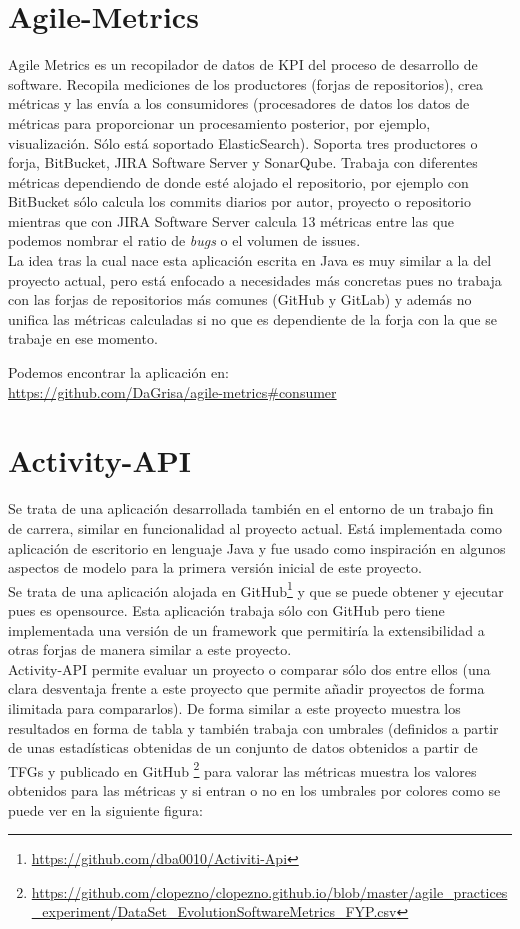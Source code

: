 \section{Agile-Metrics}
Agile Metrics es un recopilador de datos de KPI del proceso de desarrollo de software. Recopila mediciones de los productores (forjas de repositorios), crea métricas y las envía a los consumidores (procesadores de datos los datos de métricas para proporcionar un procesamiento posterior, por ejemplo, visualización. Sólo está soportado ElasticSearch). Soporta tres productores o forja, BitBucket, JIRA Software Server y SonarQube. Trabaja con diferentes métricas dependiendo de donde esté alojado el repositorio, por ejemplo con BitBucket sólo calcula los commits diarios por autor, proyecto o repositorio mientras que con JIRA Software Server calcula 13 métricas entre las que podemos nombrar el ratio de \textit{bugs} o el volumen de issues.\\

La idea tras la cual nace esta aplicación escrita en Java es muy similar a la del proyecto actual, pero está enfocado a necesidades más concretas pues no trabaja con las forjas de repositorios más comunes (GitHub y GitLab) y además no unifica las métricas calculadas si no que es dependiente de la forja con la que se trabaje en ese momento.

Podemos encontrar la aplicación en:\\
\url{https://github.com/DaGrisa/agile-metrics#consumer}



\section{Activity-API}
Se trata de una aplicación desarrollada también en el entorno de un trabajo fin de carrera, similar en funcionalidad al proyecto actual. Está implementada como aplicación de escritorio en lenguaje Java y fue usado como inspiración en algunos aspectos de modelo para la primera versión inicial\cite{TFGPrevio} de este proyecto. \\
Se trata de una aplicación alojada en GitHub\footnote{\url{https://github.com/dba0010/Activiti-Api}} y que se puede obtener y ejecutar pues es opensource. Esta aplicación trabaja sólo con GitHub pero tiene implementada una versión de un framework que permitiría la extensibilidad a otras forjas de manera similar a este proyecto.\\
Activity-API permite evaluar un proyecto o comparar sólo dos entre ellos (una clara desventaja frente a este proyecto que permite añadir proyectos de forma ilimitada para compararlos). De forma similar a este proyecto muestra los resultados en forma de tabla y también trabaja con umbrales (definidos a partir de unas estadísticas obtenidas de un conjunto de datos obtenidos a partir de TFGs y publicado en GitHub \footnote{\url{https://github.com/clopezno/clopezno.github.io/blob/master/agile_practices_experiment/DataSet_EvolutionSoftwareMetrics_FYP.csv}}  para valorar las métricas muestra los valores obtenidos para las métricas y si entran o no en los umbrales por colores como se puede ver en la siguiente figura:


